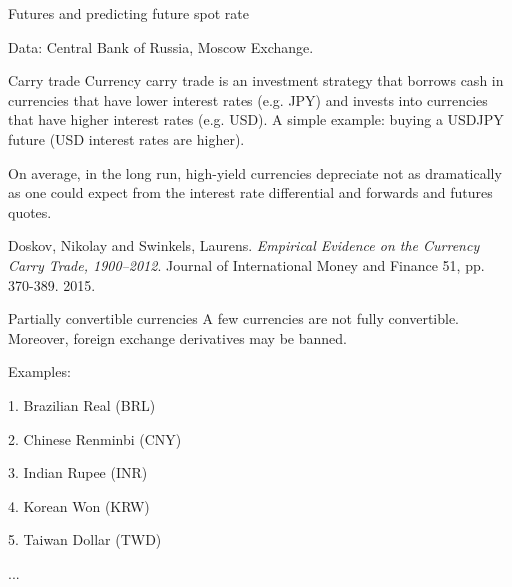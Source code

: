 \documentclass{beamer}
\begin{document}
\begin{frame}{Futures and predicting future spot rate}
\center
{}

\scriptsize Data: Central Bank of Russia, Moscow Exchange.
\end{frame}




\begin{frame}{Carry trade}
\justify
\alert{Currency carry trade} is an investment strategy that borrows cash in currencies that have lower interest rates (e.g. JPY) and invests into currencies that have higher interest rates (e.g. USD). A simple example: buying a USDJPY future (USD interest rates are higher).

\justify
On average, in the long run, high-yield currencies depreciate not as dramatically as one could expect from the interest rate differential and forwards and futures quotes.

\justify
Doskov, Nikolay and Swinkels, Laurens. \textit{Empirical Evidence on the Currency Carry Trade, 1900--2012}. Journal of International Money and Finance 51, pp. 370-389. 2015.

\end{frame}



\begin{frame}{Partially convertible currencies}
\justify
A few currencies are not fully convertible. Moreover, foreign exchange derivatives may be banned.

\justify
Examples:

1. Brazilian Real (BRL)

2. Chinese Renminbi (CNY)

3. Indian Rupee (INR)

4. Korean Won (KRW)

5. Taiwan Dollar (TWD)

...

\end{frame}
\end{document}
